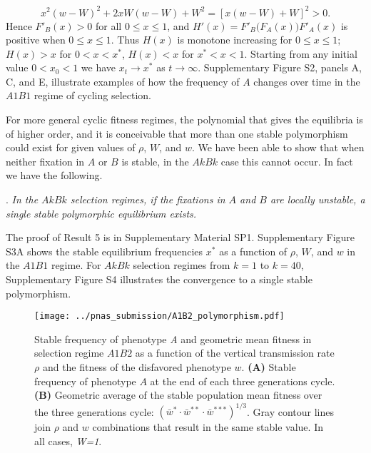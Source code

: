 \documentclass[9pt,twocolumn,twoside,lineno]{pnas-new}
\begin{document}
 \begin{equation}x^2\left(w-W\right)^2 +2xW(w-W) +W^2 =\left[x(w-W) +W\right]^2 >0.\label{27}\end{equation}
  Hence $F'_{B}(x)>0$ for all $0\le x\le 1$, and $H'(x) =F'_B\bigl(F_A(x)\bigr)F'_A(x)$ is positive when $0\le x\le 1$. Thus $H(x)$ is monotone increasing for $0\le x\le 1$; $H(x)>x$ for $0<x<x^*$, $H(x)<x$ for $x^*<x<1$.
Starting from any initial value $0<x_0 <1$ we have  $x_t\to x^*$ as $t\to\infty$. Supplementary Figure S2, panels A, C, and E, illustrate examples of how the frequency of $A$ changes over time in the $A1B1$ regime of cycling selection. 

For more general cyclic fitness regimes, the polynomial that gives the equilibria is of higher order, and it is conceivable that more than one stable polymorphism could exist for given values of $\rho$, $W$, and $w$. We have been able to show that when neither fixation in $A$ or $B$ is stable, in the $AkBk$ case this cannot occur. In fact we have the following.
\medskip

. {\sl In the $AkBk$ selection regimes, if the fixations in $A$ and $B$ are locally unstable, a single stable polymorphic equilibrium exists.}\par
\medskip

The proof of Result 5 is in Supplementary Material SP1.  Supplementary Figure S3A shows the stable equilibrium frequencies $x^*$ as a function of $\rho$, $W$, and $w$ in the $A1B1$ regime.
For $AkBk$ selection regimes from $k=1$ to $k=40$, Supplementary Figure S4 illustrates the convergence to a single stable polymorphism. 

\begin{figure}[h]
\centering
\texttt{[image: ../pnas\_submission/A1B2\_polymorphism.pdf]}
\caption{Stable frequency of phenotype \emph{A} and geometric mean fitness in selection regime
$A1B2$ as a function of the vertical transmission rate \(\rho\) and the fitness of the disfavored phenotype \(w\).
\textbf{(A)} Stable frequency of phenotype $A$ at the end of each three generations cycle.
\textbf{(B)} Geometric average of the stable population mean fitness over the three generations cycle: $(\bar{w}^* \cdot \bar{w}^{**} \cdot \bar{w}^{***})^{1/3}$.
Gray contour lines join \(\rho\) and \(w\) combinations that result in the same stable value.
In all cases, \emph{W=1}.}\label{fig:A1B2_polymorphism}
\end{figure}
\end{document}
